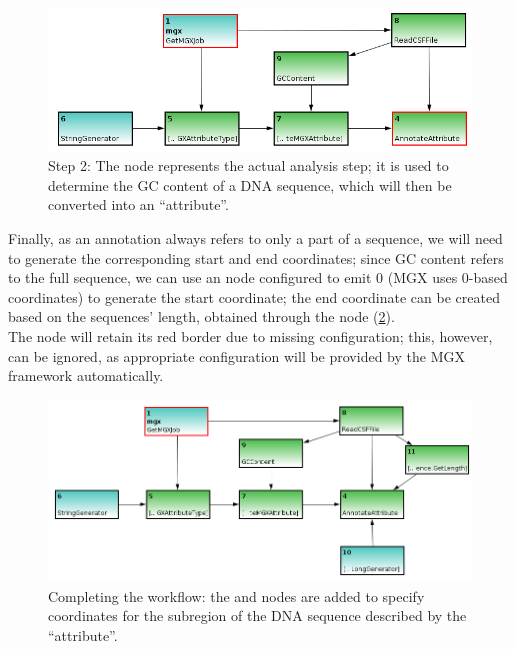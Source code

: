 \begin{figure}[H]
\centering
\includegraphics[width=.8\textwidth]{img/conveyor/annotate_templ3}
\caption[Metagenome annotation]{Step 2: The  node represents the actual analysis step; it is used
to determine the GC content of a DNA sequence, which will then be converted into an ``attribute''.}
\label{annot3}
\end{figure}

Finally, as an annotation always refers to only a part of a sequence, we will need to generate the corresponding
start and end coordinates; since GC content refers to the full sequence, we can use an  node
configured to emit 0 (MGX uses 0-based coordinates) to generate the start coordinate; the end coordinate can be
created based on the sequences' length, obtained through the  node (\ref{annot4}).\\
The  node will retain its red border due to missing configuration; this, however, can be
ignored, as appropriate configuration will be provided by the MGX framework automatically.

\begin{figure}[H]
\centering
\includegraphics[width=.9\textwidth]{img/conveyor/annotate_templ4}
\caption[Metagenome annotation]{Completing the workflow: the  and  nodes
are added to specify coordinates for the subregion of the DNA sequence described by the ``attribute''.}
\label{annot4}
\end{figure}

